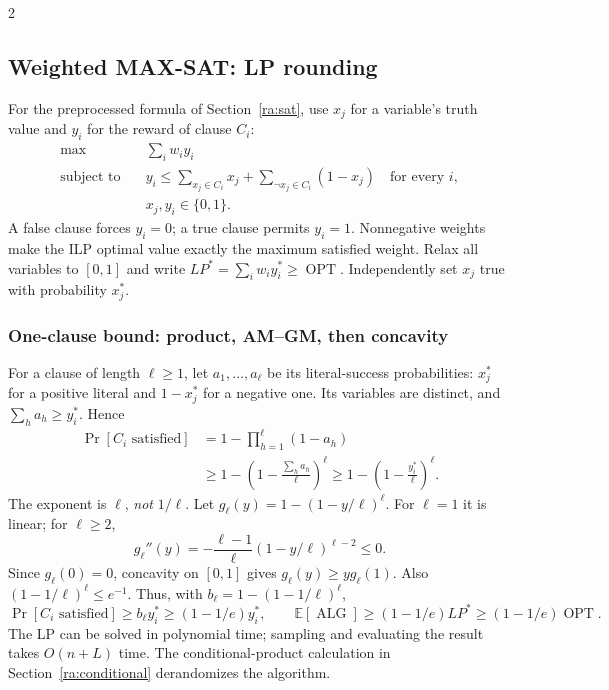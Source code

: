 \documentclass[10pt]{article}
\theoremstyle{definition}
\newcommand{\OPT}{\operatorname{OPT}}
\newcommand{\ALG}{\operatorname{ALG}}
\begin{document}
\begin{multicols*}{2}
\subsection{Weighted MAX-SAT: LP rounding}\label{lp:sat}
For the preprocessed formula of Section~\ref{ra:sat}, use $x_j$ for a
variable's truth value and $y_i$ for the reward of clause $C_i$:
\[
  \begin{aligned}
    \max\quad &\sum_iw_i y_i\\
    \text{subject to}\quad &
      y_i\le\sum_{x_j\in C_i}x_j+
             \sum_{\neg x_j\in C_i}(1-x_j)\quad\text{for every }i,\\
    &x_j,y_i\in\{0,1\}.
  \end{aligned}
\]
A false clause forces $y_i=0$; a true clause permits $y_i=1$.
Nonnegative weights make the ILP optimal value exactly the maximum
satisfied weight. Relax all variables to $[0,1]$ and write
$LP^*=\sum_iw_i y_i^*\ge\OPT$.
Independently set $x_j$ true with probability $x_j^*$.

\subsubsection*{One-clause bound: product, AM--GM, then concavity}
For a clause of length $\ell\ge1$, let $a_1,\ldots,a_\ell$ be its
literal-success probabilities: $x_j^*$ for a positive literal and
$1-x_j^*$ for a negative one. Its variables are distinct, and
$\sum_h a_h\ge y_i^*$. Hence
\[
  \begin{aligned}
    \Pr[C_i\text{ satisfied}]
      &=1-\prod_{h=1}^{\ell}(1-a_h)\\
      &\ge1-\left(1-\frac{\sum_h a_h}{\ell}\right)^{\ell}
       \ge1-\left(1-\frac{y_i^*}{\ell}\right)^{\ell}.
  \end{aligned}
\]
The exponent is $\ell$, \emph{not} $1/\ell$.
Let $g_\ell(y)=1-(1-y/\ell)^\ell$. For $\ell=1$ it is linear; for
$\ell\ge2$,
\[
  g_\ell''(y)=-\frac{\ell-1}{\ell}(1-y/\ell)^{\ell-2}\le0.
\]
Since $g_\ell(0)=0$, concavity on $[0,1]$ gives
$g_\ell(y)\ge y g_\ell(1)$. Also
$(1-1/\ell)^\ell\le e^{-1}$. Thus, with
$b_\ell=1-(1-1/\ell)^\ell$,
\[
  \Pr[C_i\text{ satisfied}]
    \ge b_\ell y_i^*\ge(1-1/e)y_i^*,\qquad
  \mathbb E[\ALG]\ge(1-1/e)LP^*\ge(1-1/e)\OPT.
\]
The LP can be solved in polynomial time; sampling and evaluating the result
takes $O(n+L)$ time. The conditional-product calculation in
Section~\ref{ra:conditional} derandomizes the algorithm.


\end{multicols*}
\end{document}
